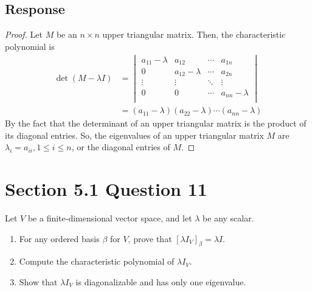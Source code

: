 \documentclass[13pt]{article}
\begin{document}
\begin{enumerate}[label=(\alph*),leftmargin=*]
    \subsection*{Response}
    \begin{proof}
      Let $M$ be an $n \times n$ upper triangular matrix. Then, the characteristic polynomial is
      \begin{align*}
        \det(M - \lambda I) &=
        \begin{vmatrix}
          a_{11} - \lambda & a_{12} & \cdots & a_{1n} \\
          0 & a_{12} - \lambda & \cdots & a_{2n} \\
          \vdots & \vdots & \ddots & \vdots \\
          0 & 0 & \cdots & a_{nn} - \lambda \\
        \end{vmatrix} \\
        &= (a_{11} - \lambda)(a_{22} - \lambda)\cdots(a_{nn} - \lambda)
      \end{align*}
      By the fact that the determinant of an upper triangular matrix is the product of its diagonal entries. So, the eigenvalues of an upper triangular matrix $M$ are $\lambda_i = a_{ii}, 1 \leq i \leq n$, or the diagonal entries of $M$.
    \end{proof}
    
    \newpage
    \section*{Section 5.1 Question 11}
    Let $V$ be a finite-dimensional vector space, and let $\lambda$ be any scalar.
    \begin{enumerate}[label=(\alph*),leftmargin=*]
    \item For any ordered basis $\beta$ for $V$, prove that $[\lambda I_V]_\beta = \lambda I$.
    \item Compute the characteristic polynomial of $\lambda I_V$.
    \item Show that $\lambda I_V$ is diagonalizable and has only one eigenvalue.
    \end{enumerate}

\end{enumerate}
\end{document}
